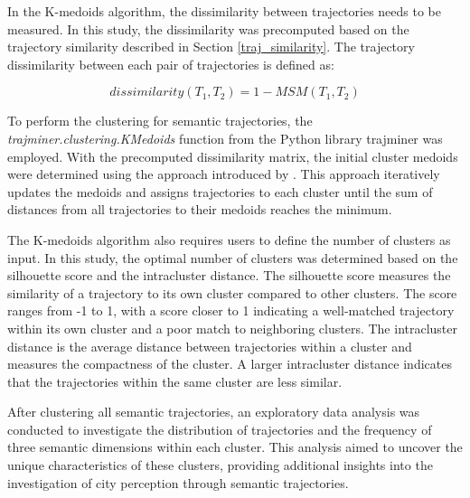 \documentclass{article}
\theoremstyle{definition}
\theoremstyle{remark}
\begin{document}
In the K-medoids algorithm, the dissimilarity between trajectories needs to be measured. In this study, the dissimilarity was precomputed based on the trajectory similarity described in Section \ref{traj_similarity}. The trajectory dissimilarity between each pair of trajectories is defined as:

\begin{equation} \label{eq:dissimilarity}
    dissimilarity(T_{1},T_{2}) = 1-MSM(T_{1},T_{2})
\end{equation}

To perform the clustering for semantic trajectories, the \textit{trajminer.clustering.KMedoids} function from the Python library trajminer was employed. With the precomputed dissimilarity matrix, the initial cluster medoids were determined using the approach introduced by \cite{park_simple_2009}. This approach iteratively updates the medoids and assigns trajectories to each cluster until the sum of distances from all trajectories to their medoids reaches the minimum.

The K-medoids algorithm also requires users to define the number of clusters as input. In this study, the optimal number of clusters was determined based on the silhouette score and the intracluster distance. The silhouette score measures the similarity of a trajectory to its own cluster compared to other clusters. The score ranges from -1 to 1, with a score closer to 1 indicating a well-matched trajectory within its own cluster and a poor match to neighboring clusters. The intracluster distance is the average distance between trajectories within a cluster and measures the compactness of the cluster. A larger intracluster distance indicates that the trajectories within the same cluster are less similar.

After clustering all semantic trajectories, an exploratory data analysis was conducted to investigate the distribution of trajectories and the frequency of three semantic dimensions within each cluster. This analysis aimed to uncover the unique characteristics of these clusters, providing additional insights into the investigation of city perception through semantic trajectories.

\end{document}
